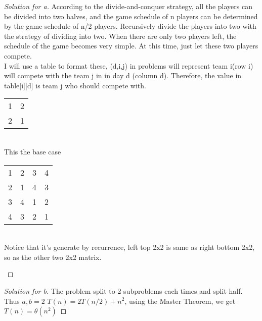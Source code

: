 \documentclass[12pt]{article}
\begin{document}
\begin{proof}[Solution for a]
	According to the divide-and-conquer strategy, all the players can be divided into two halves, and the game schedule of n players can be determined by the game schedule of n/2 players. Recursively divide the players into two with the strategy of dividing into two. When there are only two players left, the schedule of the game becomes very simple. At this time, just let these two players compete.\\
	I will use a table to format these, (d,i,j) in problems will represent team i(row i) will compete with the team j in in day d (column d). Therefore, the value in table[i][d] is team j who should compete with.
	\begin{center}

			\begin{tabular}{rr}
				1 & 2 \\
				2 & 1
			\end{tabular}\\
	 This the base case\\

		\begin{tabular}{rrrr}
			1 & 2 & 3 & 4 \\
			2 & 1 & 4 & 3 \\
			3 & 4 & 1 & 2 \\
			4 & 3 & 2 & 1
		\end{tabular}\\
	Notice that it's generate by recurrence, left top 2x2 is same as right bottom 2x2, so as the other two 2x2 matrix.

	\end{center}

\end{proof}

\begin{proof}[Solution for b]
	The problem split to 2 subproblems each times and split half. Thus $a,b=2$
	$T(n) = 2T(n/2)+n^2$, using the Master Theorem, we get $T(n)=\theta(n^2)$
\end{proof}
\end{document}
